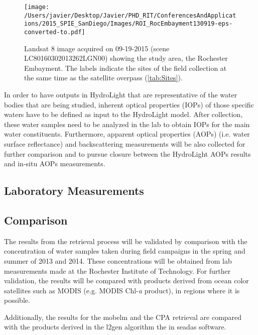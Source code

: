 \begin{figure}[htbp!]
  \centering
  \texttt{[image: /Users/javier/Desktop/Javier/PHD\_RIT/ConferencesAndApplications/2015\_SPIE\_SanDiego/Images/ROI\_RocEmbayment130919-eps-converted-to.pdf]}
  \caption{Landsat 8 image acquired on 09-19-2015 (scene LC80160302013262LGN00) showing the study area, the Rochester Embayment. The labels indicate the sites of the field collection at the same time as the satellite overpass (\autoref{tab:Sites}).\label{fig:RrsROIs130919} } 
\end{figure}

In order to have outputs in HydroLight that are representative of the water bodies that are being studied, inherent optical properties (IOPs) of those specific waters have to be defined as input to the HydroLight model. After collection, these water samples need to be analyzed in the lab to obtain IOPs for the main water constituents. Furthermore, apparent optical properties (AOPs) (i.e. water surface reflectance) and backscattering measurements will be also collected for further comparison and to pursue closure between the HydroLight AOPs results and in-situ AOPs measurements.
\subsection{Laboratory Measurements}


\subsection{Comparison}
The results from the retrieval process will be validated by comparison with the concentration of water samples taken during field campaigns in the spring and summer of 2013 and 2014. These concentrations will be obtained from lab measurements made at the Rochester Institute of Technology. For further validation, the results will be compared with products derived from ocean color satellites such as MODIS (e.g. MODIS Chl-{\it a} product), in regions where it is possible. 

Additionally, the results for the \gls{mobelm} and the CPA retrieval are compared with the products derived in the l2gen algorithm the in \gls{seadas} software.

